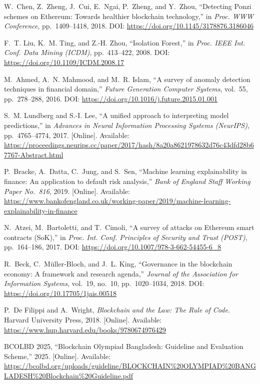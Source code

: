 \documentclass[11pt,a4paper]{article}
\begin{document}
{\begin{enumerate}[label={[\arabic*]}]
\item W.~Chen, Z.~Zheng, J.~Cui, E.~Ngai, P.~Zheng, and Y.~Zhou, ``Detecting Ponzi schemes on Ethereum: Towards healthier blockchain technology,'' in \textit{Proc. WWW Conference}, pp.~1409--1418, 2018. DOI: \url{https://doi.org/10.1145/3178876.3186046}
\item F.~T. Liu, K.~M. Ting, and Z.-H. Zhou, ``Isolation Forest,'' in \textit{Proc. IEEE Int. Conf. Data Mining (ICDM)}, pp.~413--422, 2008. DOI: \url{https://doi.org/10.1109/ICDM.2008.17}
\item M.~Ahmed, A.~N. Mahmood, and M.~R. Islam, ``A survey of anomaly detection techniques in financial domain,'' \textit{Future Generation Computer Systems}, vol.~55, pp.~278--288, 2016. DOI: \url{https://doi.org/10.1016/j.future.2015.01.001}
\item S.~M. Lundberg and S.-I. Lee, ``A unified approach to interpreting model predictions,'' in \textit{Advances in Neural Information Processing Systems (NeurIPS)}, pp.~4765--4774, 2017. [Online]. Available: \url{https://proceedings.neurips.cc/paper/2017/hash/8a20a8621978632d76c43dfd28b67767-Abstract.html}
\item P.~Bracke, A.~Datta, C.~Jung, and S.~Sen, ``Machine learning explainability in finance: An application to default risk analysis,'' \textit{Bank of England Staff Working Paper No.~816}, 2019. [Online]. Available: \url{https://www.bankofengland.co.uk/working-paper/2019/machine-learning-explainability-in-finance}
\item N.~Atzei, M.~Bartoletti, and T.~Cimoli, ``A survey of attacks on Ethereum smart contracts (SoK),'' in \textit{Proc. Int. Conf. Principles of Security and Trust (POST)}, pp.~164--186, 2017. DOI: \url{https://doi.org/10.1007/978-3-662-54455-6_8}
\item R.~Beck, C.~Müller-Bloch, and J.~L. King, ``Governance in the blockchain economy: A framework and research agenda,'' \textit{Journal of the Association for Information Systems}, vol.~19, no.~10, pp.~1020--1034, 2018. DOI: \url{https://doi.org/10.17705/1jais.00518}
\item P.~De Filippi and A.~Wright, \textit{Blockchain and the Law: The Rule of Code}. Harvard University Press, 2018. [Online]. Available: \url{https://www.hup.harvard.edu/books/9780674976429}
\item BCOLBD 2025, ``Blockchain Olympiad Bangladesh: Guideline and Evaluation Scheme,'' 2025. [Online]. Available: \url{https://bcolbd.org/uploads/guideline/BLOCKCHAIN\%20OLYMPIAD\%20BANGLADESH\%20Blockchain\%20Guideline.pdf}

\end{enumerate}}
\end{document}

